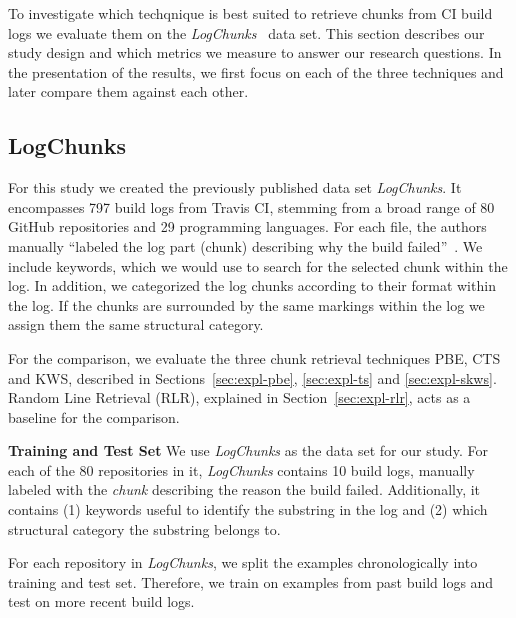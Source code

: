 To investigate which techqnique is best suited to retrieve chunks from
CI build logs we evaluate them on the
\emph{LogChunks}~\cite{brandt2020logchunks} data set.
This section
describes our study design and which metrics we measure to answer our
research questions.
In the presentation of the results, we first focus
on each of the three techniques and later compare them against each
other.

\subsection{LogChunks}
For this study we created the previously published data set
\emph{LogChunks}.
It encompasses 797 build logs from Travis CI,
stemming from a broad range of 80 GitHub repositories and 29
programming languages.
For each file, the authors manually ``labeled
the log part (chunk) describing why the build
failed''~\cite{brandt2020logchunks}.
We include keywords, which we
would use to search for the selected chunk within the log.
In
addition, we categorized the log chunks according to their format
within the log.
If the chunks are surrounded by the same markings
within the log we assign them the same structural category.

For the comparison, we evaluate the three chunk retrieval techniques
PBE, CTS and KWS, described in Sections~\ref{sec:expl-pbe},
\ref{sec:expl-ts} and \ref{sec:expl-skws}.
Random Line Retrieval
(RLR), explained in Section~\ref{sec:expl-rlr}, acts as a baseline for
the comparison.

\noindent
\textbf{Training and Test Set}
We use \emph{LogChunks} as the data set for our study.
For each of the
80 repositories in it, \emph{LogChunks} contains 10 build logs,
manually labeled with the \emph{chunk} describing the
reason the build failed.
Additionally, it contains (1) keywords useful
to identify the substring in the log  and (2) which structural category
the substring belongs to.

For each repository in \emph{LogChunks}, we split the examples
chronologically into training and test set.
Therefore, we train on
examples from past build logs and test on more recent build logs.

